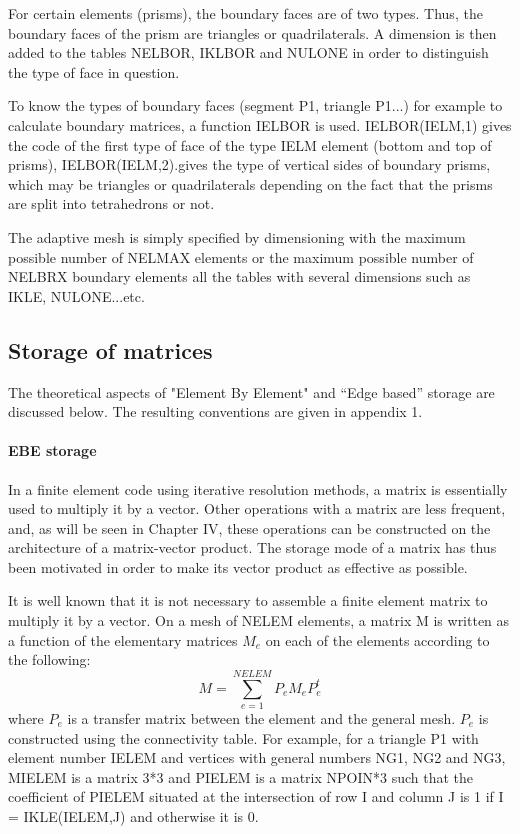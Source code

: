 For certain elements (prisms), the boundary faces are of two types. Thus, the
boundary faces of the prism are triangles or quadrilaterals. A dimension is
then added to the tables NELBOR, IKLBOR and NULONE in order to distinguish the
type of face in question.

To know the types of boundary faces (segment P1, triangle P1...) for example to
calculate boundary matrices, a function IELBOR is used. IELBOR(IELM,1) gives
the code of the first type of face of the type IELM element (bottom and top of
prisms), IELBOR(IELM,2).gives the type of vertical sides of boundary prisms,
which may be triangles or quadrilaterals depending on the fact that the prisms
are split into tetrahedrons or not.

The adaptive mesh is simply specified by dimensioning with the maximum possible
number of NELMAX elements or the maximum possible number of NELBRX boundary
elements all the tables with several dimensions such as IKLE, NULONE...etc.

\subsection{Storage of matrices}

The theoretical aspects of "Element By Element" and ``Edge based'' storage are
discussed below. The resulting conventions are given in appendix 1.

\paragraph{EBE storage}

In a finite element code using iterative resolution methods, a matrix is
essentially used to multiply it by a vector. Other operations with a matrix are
less frequent, and, as will be seen in Chapter IV, these operations can be
constructed on the architecture of a matrix-vector product. The storage mode of
a matrix has thus been motivated in order to make its vector product as
effective as possible.

It is well known that it is not necessary to assemble a finite element matrix
to multiply it by a vector. On a mesh of NELEM elements, a matrix M is written
as a function of the elementary matrices $M_{e}$ on each of the elements according
to the following:
\[M=\sum _{e=1}^{NELEM}P_{e} M_{e} P_{e}^{t}  \]
where $P_{e}$ is a transfer matrix between the element and the general mesh.
$P_{e}$ is constructed using the connectivity table. For example, for a
triangle P1 with element number IELEM and vertices with general numbers NG1,
NG2 and NG3, MIELEM is a matrix 3*3 and PIELEM is a matrix NPOIN*3 such that
the coefficient of PIELEM situated at the intersection of row I and column J is
1 if I = IKLE(IELEM,J) and otherwise it is 0.

